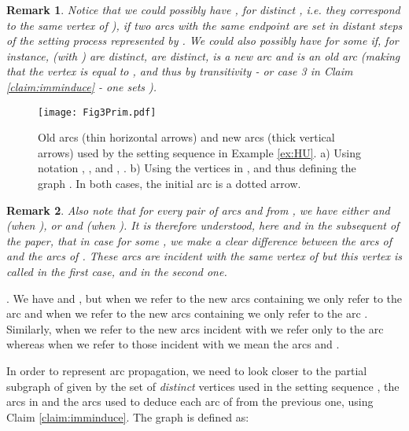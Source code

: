 \documentclass{article}
\newtheorem{rmk}{Remark}
\newcommand{\br}{\begin{rmk}\rm}
\newcommand{\er}{\end{rmk}}
\begin{document}
\br
Notice that we could possibly have , for distinct , {\em i.e.} they
correspond to the same vertex of ), if two
arcs with the same endpoint are set in distant steps of the setting process represented by . We could also
possibly have   for some  if, for instance,  (with ) are distinct,
 are  distinct,  is a new arc and  is an old arc 
(making that the vertex  is equal to , and thus by transitivity - or case 3 in Claim \ref{claim:imminduce} - 
one sets ).
\label{rem:several}
\er


\begin{figure}[t]
\vspace*{-1.5cm}
\begin{center}
\texttt{[image: Fig3Prim.pdf]}
\end{center}
\vspace*{-4cm}
\caption{{\small Old arcs (thin horizontal arrows) and new arcs (thick vertical arrows) used by 
the setting sequence  in Example \ref{ex:HU}. a) Using notation , , and , . b) Using 
the vertices in , and thus defining the graph . In both cases, the initial arc  is
a dotted arrow.}}
\label{fig:ex3}
\end{figure}


\br
Also note that for every pair of  arcs  and  from , we
have either  and  (when ), or  
and  (when ). It is therefore understood,
here and in the subsequent of the paper, that in case  for some ,
we make a clear difference between the arcs  of  and the arcs  of .
These arcs are incident with the same vertex of  but this vertex is called 
in the first case, and  in the second one.
\label{rem:HU}
\er

. We have
 and , but when we refer to the new arcs containing  we only refer to
the arc  and when we refer to the new arcs containing  we only refer to the arc .
Similarly, when we refer to the new arcs incident with  we refer only to the arc  whereas
when we refer to those incident with  we mean the arcs  and .
\bigskip

In order to represent arc propagation, we need to look closer to the partial subgraph   of  
given by the set of {\em distinct} vertices  used in the
setting sequence , the arcs in  and the arcs used to deduce each arc of  from the previous one, 
using Claim \ref{claim:imminduce}. The graph  is defined as:
\medskip

 



\hspace*{1.85cm} 
\end{document}
